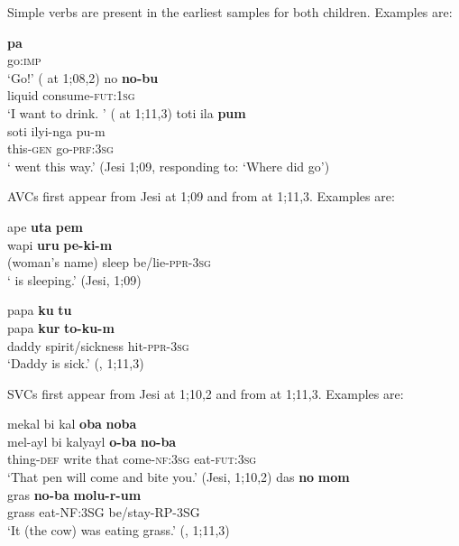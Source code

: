 \documentclass[output=paper]{langsci/langscibook}
\begin{document}
Simple verbs are present in the earliest samples for both children. Examples are:

\ea
\ea
   \gll   \textbf{pa}\\                        
          go:\textsc{imp}       \\                             
          \glt `Go!'                                       
        ( at 1;08,2)                            
\ex
 \gll no       \textbf{no-bu}\\
        liquid  consume-\textsc{fut}:\textsc{1sg} \\  
  \glt `I want to drink. '
 ( at 1;11,3) 
\ex
\glll toti ila \textbf{pum}\\
 soti ilyi-nga pu-m\\
 this-\textsc{gen} go-\textsc{prf}:\textsc{3sg}\\
\glt            ` went this way.' (Jesi 1;09, responding   to: ‘Where did  go’)
\z
\z

\newpage 
AVCs first appear from Jesi at 1;09 and from  at 1;11,3. Examples are:  

\ea
\ea
\glll ape                   \textbf{uta}       \textbf{pem}\\
wapi                 \textbf{uru}      \textbf{pe-ki-m}\\
{(woman's name)}    sleep      be/lie-\textsc{ppr}-\textsc{3sg}\\
\glt ` is sleeping.'   (Jesi, 1;09) 
\ex

\glll    papa   \textbf{ku} \textbf{tu} \\
    papa    \textbf{kur} \textbf{to-ku-m}\\
    daddy    spirit/sickness    hit-\textsc{ppr-3sg}\\
\glt    `Daddy is sick.' (, 1;11,3)          

\z
\z

SVCs first appear from Jesi at 1;10,2 and from  at 1;11,3. Examples are: 

\ea
\ea
 \glll mekal       bi       kal       \textbf{oba}      \textbf{noba}\\
     mel-ayl       bi       kalyayl   \textbf{o-ba}   \textbf{no-ba}\\
     thing-\textsc{def}    write    that      come-\textsc{nf:3sg}  eat-\textsc{fut:3sg}\\
\glt     `That pen will come and bite you.'                        
         (Jesi, 1;10,2)                                       
\ex
\glll das     \textbf{no} \textbf{mom}         \\
       gras \textbf{no-ba}        \textbf{molu-r-um} \\
        grass    eat-NF:3SG  be/stay-RP-3SG\\
\glt     `It (the cow) was eating grass.'
                  (, 1;11,3)
\z
\z
\end{document}
